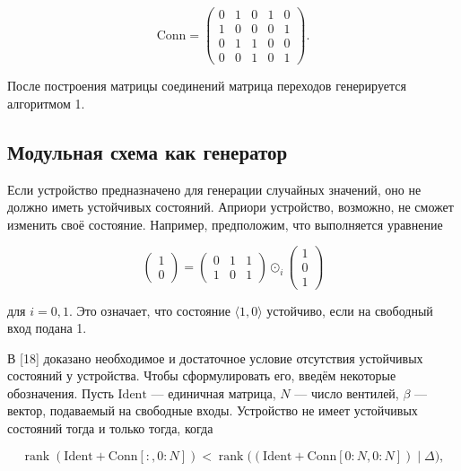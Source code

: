 \documentclass[a4paper,12pt]{article}
\DeclareMathOperator{\rank}{rank}
\begin{document}
\begin{equation}
\mathrm{Conn} = 
\begin{pmatrix}
0 & 1 & 0 & 1 & 0\\
1 & 0 & 0 & 0 & 1\\
0 & 1 & 1 & 0 & 0\\
0 & 0 & 1 & 0 & 1
\end{pmatrix}. \label{eq:2}
\end{equation}

После построения матрицы соединений матрица переходов генерируется алгоритмом 1.

\subsection{Модульная схема как генератор}

Если устройство предназначено для генерации случайных значений, оно не должно иметь устойчивых состояний. Априори устройство, возможно, не сможет изменить своё состояние. Например, предположим, что выполняется уравнение

\begin{equation}
\begin{pmatrix}
1 \\
0
\end{pmatrix}
=
\begin{pmatrix}
0 & 1 & 1 \\
1 & 0 & 1
\end{pmatrix}
\odot_i
\begin{pmatrix}
1 \\
0 \\
1
\end{pmatrix}
\label{eq:3}
\end{equation}

для \(i = 0,1\). Это означает, что состояние \(\langle 1,0 \rangle\) устойчиво, если на свободный вход подана 1.

В [18] доказано необходимое и достаточное условие отсутствия устойчивых состояний у устройства. Чтобы сформулировать его, введём некоторые обозначения. Пусть \(\mathrm{Ident}\) --- единичная матрица, \(N\) --- число вентилей, \(\beta\) --- вектор, подаваемый на свободные входы. Устройство не имеет устойчивых состояний тогда и только тогда, когда

\begin{equation}
\rank(\mathrm{Ident} + \mathrm{Conn}[:,0:N])
<
\rank\bigl((\mathrm{Ident} + \mathrm{Conn}[0:N,0:N]) \mid \Delta\bigr), \label{eq:4}
\end{equation}
\end{document}

